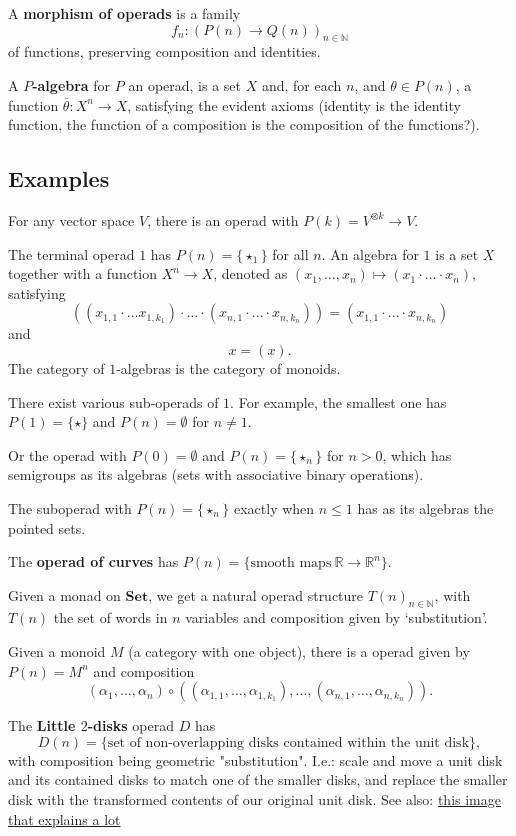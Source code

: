 \documentclass{amsbook}
\newcommand{\Catb}[1]{\mathbf{#1}}
\newcommand{\SET}{\Catb{Set}}
\begin{document}
  A \textbf{morphism of operads} is a family
  \[ f_n : (P(n) \to Q(n))_{n \in \mathbb N} \]
  of functions, preserving composition and identities.

  A \textbf{$ P $-algebra} for $ P $ an operad, is a set $ X $ and, for each $ n $, and $ \theta \in P(n) $, a function $ \overline{\theta}: X^n \to X $, satisfying the evident axioms (identity is the identity function, the function of a composition is the composition of the functions?).
  
  \subsection{Examples}
  For any vector space $ V $, there is an operad with $ P(k) = V^{\otimes k} \to V $.

  The terminal operad $ 1 $ has $ P(n) = \{ \star_1 \} $ for all $ n $. An algebra for $ 1 $ is a set $ X $ together with a function $ X^n \to X $, denoted as $ (x_1, \dots, x_n) \mapsto (x_1 \cdot \dots \cdot x_n) $, satisfying
  \[ ((x_{1, 1} \cdot \dots x_{1, k_1}) \cdot \dots \cdot (x_{n, 1} \cdot \dots \cdot x_{n, k_n})) = (x_{1, 1} \cdot \dots \cdot x_{n, k_n}) \]
  and
  \[ x = (x). \]
  The category of $ 1 $-algebras is the category of monoids.

  There exist various sub-operads of $ 1 $. For example, the smallest one has $ P(1) = \{ \star \} $ and $ P(n) = \emptyset $ for $ n \not = 1 $.

  Or the operad with $ P(0) = \emptyset $ and $ P(n) = \{ \star_n \} $ for $ n > 0 $, which has semigroups as its algebras (sets with associative binary operations).

  The suboperad with $ P(n) = \{ \star_n \} $ exactly when $ n \leq 1 $ has as its algebras the pointed sets.

  The \textbf{operad of curves} has $ P(n) = \{ \text{smooth maps}\ \mathbb R \to \mathbb R^n \} $.

  Given a monad on $ \SET $, we get a natural operad structure $ T(n)_{n \in \mathbb N} $, with $ T(n) $ the set of words in $ n $ variables and composition given by `substitution'.

  Given a monoid $ M $ (a category with one object), there is a operad given by $ P(n) = M^n $ and composition
  \[ (\alpha_1, \dots, \alpha_n) \circ ((\alpha_{1, 1}, \dots, \alpha_{1, k_1}), \dots, (\alpha_{n, 1}, \dots, \alpha_{n, k_n})). \]

  The \textbf{Little $ 2 $-disks} operad $ D $ has 
  \[ D(n) = \{ \text{set of non-overlapping disks contained within the unit disk} \}, \]
  with composition being geometric "substitution". I.e.: scale and move a unit disk and its contained disks to match one of the smaller disks, and replace the smaller disk with the transformed contents of our original unit disk. See also: \href{https://upload.wikimedia.org/wikipedia/en/thumb/0/0b/Composition_in_the_little_discs_operad.svg/1920px-Composition_in_the_little_discs_operad.svg.png}{this image that explains a lot}
\end{document}
